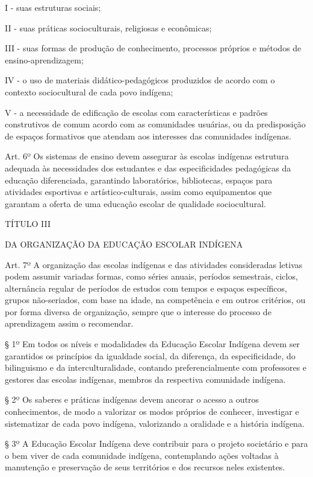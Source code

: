 \documentclass[
]{book}
\begin{document}
I - suas estruturas sociais;

II - suas práticas socioculturais, religiosas e econômicas;

III - suas formas de produção de conhecimento, processos próprios e métodos de ensino-aprendizagem;

IV - o uso de materiais didático-pedagógicos produzidos de acordo com o contexto sociocultural de cada povo indígena;

V - a necessidade de edificação de escolas com características e padrões construtivos de comum acordo com as comunidades usuárias, ou da predisposição de espaços formativos que atendam aos interesses das comunidades indígenas.

Art. 6º Os sistemas de ensino devem assegurar às escolas indígenas estrutura adequada às necessidades dos estudantes e das especificidades pedagógicas da educação diferenciada, garantindo laboratórios, bibliotecas, espaços para atividades esportivas e artístico-culturais, assim como equipamentos que garantam a oferta de uma educação escolar de qualidade sociocultural.

TÍTULO III

DA ORGANIZAÇÃO DA EDUCAÇÃO ESCOLAR INDÍGENA

Art. 7º A organização das escolas indígenas e das atividades consideradas letivas podem assumir variadas formas, como séries anuais, períodos semestrais, ciclos, alternância regular de períodos de estudos com tempos e espaços específicos, grupos não-seriados, com base na idade, na competência e em outros critérios, ou por forma diversa de organização, sempre que o interesse do processo de aprendizagem assim o recomendar.

§ 1º Em todos os níveis e modalidades da Educação Escolar Indígena devem ser garantidos os princípios da igualdade social, da diferença, da especificidade, do bilinguismo e da interculturalidade, contando preferencialmente com professores e gestores das escolas indígenas, membros da respectiva comunidade indígena.

§ 2º Os saberes e práticas indígenas devem ancorar o acesso a outros conhecimentos, de modo a valorizar os modos próprios de conhecer, investigar e sistematizar de cada povo indígena, valorizando a oralidade e a história indígena.

§ 3º A Educação Escolar Indígena deve contribuir para o projeto societário e para o bem viver de cada comunidade indígena, contemplando ações voltadas à manutenção e preservação de seus territórios e dos recursos neles existentes.
\end{document}
